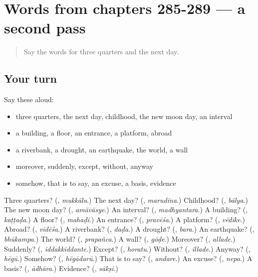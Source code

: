 \section[(dialogue)]{Words from chapters 285-289 — a second pass}

\label{lesson:KA-R289-second-pass-words-from-chapters-285-289}



\begin{quote}
Say the words for three quarters and the next day.
\end{quote}

\subsection*{Your turn}
Say these aloud:

\begin{itemize}
\raggedright
  \item three quarters, the next day, childhood, the new moon day, an interval
  \item a building, a floor, an entrance, a platform, abroad
  \item a riverbank, a drought, an earthquake, the world, a wall
  \item moreover, suddenly, except, without, anyway
  \item somehow, that is to say, an excuse, a basis, evidence
\end{itemize}

\begin{tcolorbox}[breakable,colback=teal!4,colframe=teal!35!black,title={Before you move on}]
Three quarters? (\textbf{}, \emph{mukkālu}.) The next day? (\textbf{}, \emph{marudina}.) Childhood? (\textbf{}, \emph{bālya}.) The new moon day? (\textbf{}, \emph{amāvāsye}.) An interval? (\textbf{}, \emph{madhyantara}.) A building? (\textbf{}, \emph{kaṭṭaḍa}.) A floor? (\textbf{}, \emph{mahaḍi}.) An entrance? (\textbf{}, \emph{pravēśa}.) A platform? (\textbf{}, \emph{vēdike}.) Abroad? (\textbf{}, \emph{vidēśa}.) A riverbank? (\textbf{}, \emph{daḍa}.) A drought? (\textbf{}, \emph{bara}.) An earthquake? (\textbf{}, \emph{bhūkampa}.) The world? (\textbf{}, \emph{prapañca}.) A wall? (\textbf{}, \emph{gōḍe}.) Moreover? (\textbf{}, \emph{allade}.) Suddenly? (\textbf{}, \emph{iddakkiddante}.) Except? (\textbf{}, \emph{horatu}.) Without? (\textbf{}, \emph{illade}.) Anyway? (\textbf{}, \emph{hēgū}.) Somehow? (\textbf{}, \emph{hēgādarū}.) That is to say? (\textbf{}, \emph{andare}.) An excuse? (\textbf{}, \emph{nepa}.) A basis? (\textbf{}, \emph{ādhāra}.) Evidence? (\textbf{}, \emph{sākṣi}.)
\end{tcolorbox}

